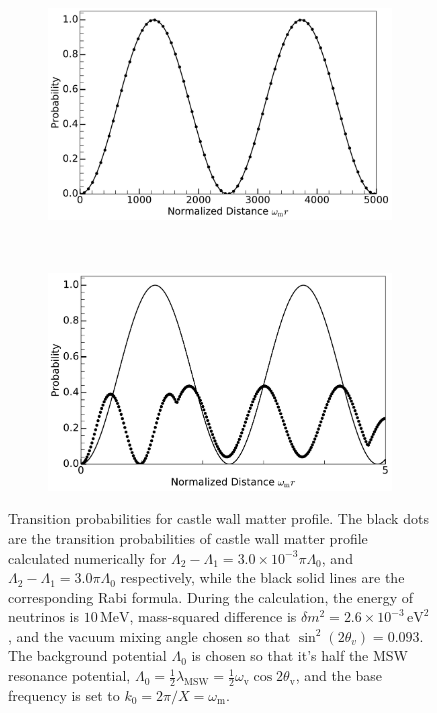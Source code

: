 \documentclass[%
reprint,
 amsmath,amssymb,
 prd,
]{revtex4-1}
\begin{document}
\begin{figure}
    \centering
    \begin{subfigure}[b]{0.5\textwidth}
        \centering
        \includegraphics[width=\columnwidth]{assets/castle-wall-2}
    \caption{}
    \label{fig-akhmedovOscPlt-a}
    \end{subfigure}%
    ~ 
    \begin{subfigure}[b]{0.5\textwidth}
        \centering
        \includegraphics[width=\columnwidth]{assets/castle-wall-1}
        \caption{}
        \label{fig-akhmedovOscPlt-b}
    \end{subfigure}
    \caption{Transition probabilities for castle wall matter profile. 
    The black dots are the transition probabilities of castle wall matter profile calculated numerically for $\Lambda_2-\Lambda_1=3.0\times 10^{-3}\pi\Lambda_0$, and $\Lambda_2-\Lambda_1=3.0\pi\Lambda_0$ respectively, while the black solid lines are the corresponding Rabi formula. During the calculation, the energy of neutrinos is $10\,\mathrm{MeV}$, mass-squared difference is $\delta m^2=2.6\times 10^{-3}\,\mathrm{eV^2}$, and the vacuum mixing angle chosen so that $\sin^2(2\theta_v)=0.093$. The background potential $\Lambda_0$ is chosen so that it's half the MSW resonance potential, $\Lambda_0 = \frac{1}{2}\lambda_{\mathrm{MSW}}=\frac{1}{2}\omega_{\mathrm{v}}\cos 2\theta_{\mathrm v}$, and the base frequency is set to $k_0 = 2\pi/X = \omega_{\mathrm{m}}$.
                 }
    \label{fig-akhmedovOscPlt}
\end{figure}
\end{document}
